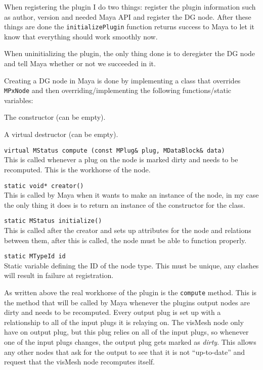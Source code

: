 When registering the plugin I do two things: register the plugin information
such as author, version and needed Maya API and register the DG node.  After
these things are done the \texttt{initializePlugin} function returns success to
Maya to let it know that everything should work smoothly now.

When uninitializing the plugin, the only thing done is to deregister the DG node
and tell Maya whether or not we succeeded in it.

Creating  a DG node in Maya is done by implementing a class that overrides
\texttt{MPxNode} and then overriding/implementing the following functions/static
variables:
\begin{itemize*}
  \item The constructor (can be empty).
  \item A virtual destructor (can be empty).
  \item \texttt{virtual MStatus compute (const MPlug\& plug, MDataBlock\& data)}\\
    This is called whenever a plug on the node is marked dirty and needs to be
    recomputed. This is the workhorse of the node.
  \item \texttt{static void* creator()}\\
    This is called by Maya when it wants to make an instance of the node, in my
    case the only thing it does is to return an instance of the constructor for
    the class.
  \item \texttt{static MStatus initialize()}\\
    This is called after the creator and sets up attributes for the node and
    relations between them, after this is called, the node must be able to
    function properly.
  \item \texttt{static MTypeId id}\\
    Static variable defining the ID of the node type. This must be unique, any
    clashes will result in failure at registration.
\end{itemize*}

As written above the real workhorse of the plugin is the \texttt{compute}
method. This is the method that will be called by Maya whenever the plugins
output nodes are dirty and needs to be recomputed. Every output plug is set up
with a relationship to all of the input plugs it is relaying on. The visMesh
node only have on output plug, but this plug relies on all of the input plugs,
so whenever one of the input plugs changes, the output plug gets marked as
\textit{dirty}. This allows any other nodes that ask for the output to see that
it is not ``up-to-date'' and request that the visMesh node recomputes itself.

